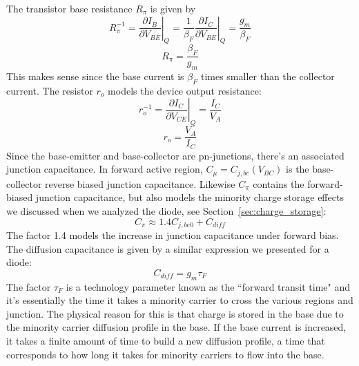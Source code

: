 The transistor base resistance $R_\pi$ is given by
\begin{equation}
	R_\pi^{-1} = \left. \frac{\partial I_B}{\partial V_{BE}} \right|_Q 
				= \frac{1}{\beta_F} \left. \frac{\partial I_C}{\partial V_{BE}}  \right|_Q
	 			= \frac{g_m}{\beta_F}
\end{equation}
\begin{equation}
	R_\pi = \frac{\beta_F}{g_m}
\end{equation}
This makes sense since the base current is $\beta_F$ times smaller than the collector current.  The resistor $r_o$ models the device output resistance: 
\begin{equation}
	r_o^{-1} = \left. \frac{\partial I_C}{\partial V_{CE}} \right|_Q  = \frac{I_C}{V_A}
\end{equation}
\begin{equation}
	r_o = \frac{V_A}{I_C}
\end{equation}
Since the base-emitter and base-collector are pn-junctions, there's an associated junction capacitance.  In forward active region, $C_{\mu} = C_{j,bc}(V_{BC})$ is the base-collector reverse biased junction capacitance.  Likewise $C_\pi$ contains the forward-biased junction capacitance, but also models the minority charge storage effects we discussed when we analyzed the diode, see Section~\ref{sec:charge_storage}:
\begin{equation}
	C_\pi \approx 1.4 C_{j,be0} + C_{diff}
\end{equation}
The factor 1.4 models the increase in junction capacitance under forward bias.  The diffusion capacitance is given by a similar expression we presented for a diode:
\begin{equation}
	C_{diff} = g_m \tau_F 
\end{equation}
The factor $\tau_F$ is a technology parameter known as the ``forward transit time" and it's essentially the time it takes a minority carrier to cross the various regions and junction.  The physical reason for this is that charge is stored in the base due to the minority carrier diffusion profile in the base.  If the base current is increased, it takes a finite amount of time to build a new diffusion profile, a time that corresponds to how long it takes for minority carriers to flow into the base.
